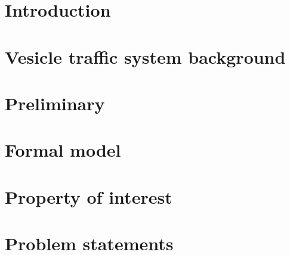 \documentclass[smallcondensed]{svjour3}     %
\begin{document}
\date{Received: date / Accepted: date}

\maketitle


\begin{abstract}

\end{abstract}

\section{Introduction}
\label{sec:intro}


\section{Vesicle traffic system background}
\label{sec:bio}


\section{Preliminary}
\label{sec:prelim}


\section{Formal model}
\label{sec:model}


\section{Property of interest}
\label{sec:property}


\section{Problem statements}
\label{sec:problem}

\end{document}
